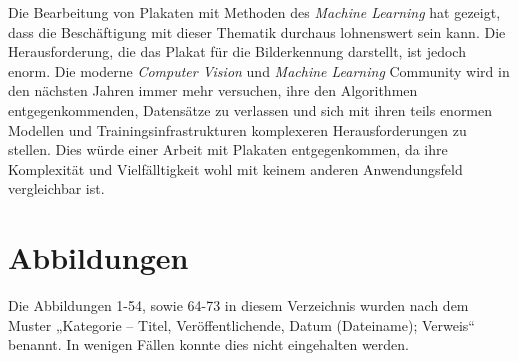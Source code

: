 \documentclass[a4paper,12pt,ngerman]{article}
\begin{document}
Die Bearbeitung von Plakaten mit Methoden des \textit{Machine Learning} hat gezeigt, dass die Beschäftigung mit dieser Thematik durchaus lohnenswert sein kann. Die Herausforderung, die das Plakat für die Bilderkennung darstellt, ist jedoch enorm. Die moderne \textit{Computer Vision} und \textit{Machine Learning} Community wird in den nächsten Jahren immer mehr versuchen, ihre den Algorithmen entgegenkommenden, Datensätze zu verlassen und sich mit ihren teils enormen Modellen und Trainingsinfrastrukturen komplexeren Herausforderungen zu stellen. Dies würde einer Arbeit mit Plakaten entgegenkommen, da ihre Komplexität und Vielfälltigkeit wohl mit keinem anderen Anwendungsfeld vergleichbar ist.

\newpage

\section{Abbildungen}
Die Abbildungen 1-54, sowie 64-73 in diesem Verzeichnis wurden nach dem Muster „Kategorie -- Titel, Veröffentlichende, Datum (Dateiname); Verweis“ benannt. In wenigen Fällen konnte dies nicht eingehalten werden. \\
\end{document}
